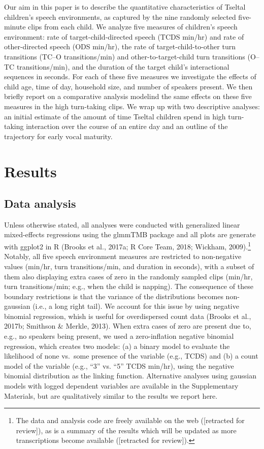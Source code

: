 \documentclass[floatsintext,man]{apa6}
\theoremstyle{definition}
\theoremstyle{definition}
\theoremstyle{definition}
\theoremstyle{remark}
\begin{document}
Our aim in this paper is to describe the quantitative characteristics of
Tseltal children's speech environments, as captured by the nine randomly
selected five-minute clips from each child. We analyze five measures of
children's speech environment: rate of target-child-directed speech
(TCDS min/hr) and rate of other-directed speech (ODS min/hr), the rate
of target-child-to-other turn transitions (TC--O transitions/min) and
other-to-target-child turn transitions (O--TC transitions/min), and the
duration of the target child's interactional sequences in seconds. For
each of these five measures we investigate the effects of child age,
time of day, household size, and number of speakers present. We then
briefly report on a comparative analysis modelind the same effects on
these five measures in the high turn-taking clips. We wrap up with two
descriptive analyses: an initial estimate of the amount of time Tseltal
children spend in high turn-taking interaction over the course of an
entire day and an outline of the trajectory for early vocal maturity.

\section{Results}\label{results}

\subsection{Data analysis}\label{data-analysis}

Unless otherwise stated, all analyses were conducted with generalized
linear mixed-effects regressions using the glmmTMB package and all plots
are generate with ggplot2 in R (Brooks et al., 2017a; R Core Team, 2018;
Wickham, 2009).\footnote{The data and analysis code are freely available
  on the web ({[}retracted for review{]}), as is a summary of the
  results which will be updated as more transcriptions become available
  ({[}retracted for review{]}).} Notably, all five speech environment
measures are restricted to non-negative values (min/hr, turn
transitions/min, and duration in seconds), with a subset of them also
displaying extra cases of zero in the randomly sampled clips (min/hr,
turn transitions/min; e.g., when the child is napping). The consequence
of these boundary restrictions is that the variance of the distributions
becomes non-gaussian (i.e., a long right tail). We account for this
issue by using negative binomial regression, whish is useful for
overdispersed count data (Brooks et al., 2017b; Smithson \& Merkle,
2013). When extra cases of zero are present due to, e.g., no speakers
being present, we used a zero-inflation negative binomial regression,
which creates two models: (a) a binary model to evaluate the likelihood
of none vs.~some presence of the variable (e.g., TCDS) and (b) a count
model of the variable (e.g., \enquote{3} vs. \enquote{5} TCDS min/hr),
using the negative binomial distribution as the linking function.
Alternative analyses using gaussian models with logged dependent
variables are available in the Supplementary Materials, but are
qualitatively similar to the results we report here.
\end{document}
